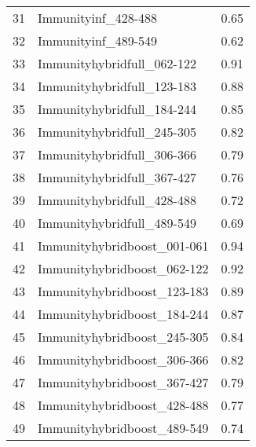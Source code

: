 \begin{table}[ht]
\begin{tabular}{rlr}
  31 & Immunityinf\_428-488 & 0.65 \\ 
  32 & Immunityinf\_489-549 & 0.62 \\ 
  33 & Immunityhybridfull\_062-122 & 0.91 \\ 
  34 & Immunityhybridfull\_123-183 & 0.88 \\ 
  35 & Immunityhybridfull\_184-244 & 0.85 \\ 
  36 & Immunityhybridfull\_245-305 & 0.82 \\ 
  37 & Immunityhybridfull\_306-366 & 0.79 \\ 
  38 & Immunityhybridfull\_367-427 & 0.76 \\ 
  39 & Immunityhybridfull\_428-488 & 0.72 \\ 
  40 & Immunityhybridfull\_489-549 & 0.69 \\ 
  41 & Immunityhybridboost\_001-061 & 0.94 \\ 
  42 & Immunityhybridboost\_062-122 & 0.92 \\ 
  43 & Immunityhybridboost\_123-183 & 0.89 \\ 
  44 & Immunityhybridboost\_184-244 & 0.87 \\ 
  45 & Immunityhybridboost\_245-305 & 0.84 \\ 
  46 & Immunityhybridboost\_306-366 & 0.82 \\ 
  47 & Immunityhybridboost\_367-427 & 0.79 \\ 
  48 & Immunityhybridboost\_428-488 & 0.77 \\ 
  49 & Immunityhybridboost\_489-549 & 0.74 \\ 
   \hline
\end{tabular}
\end{table}
